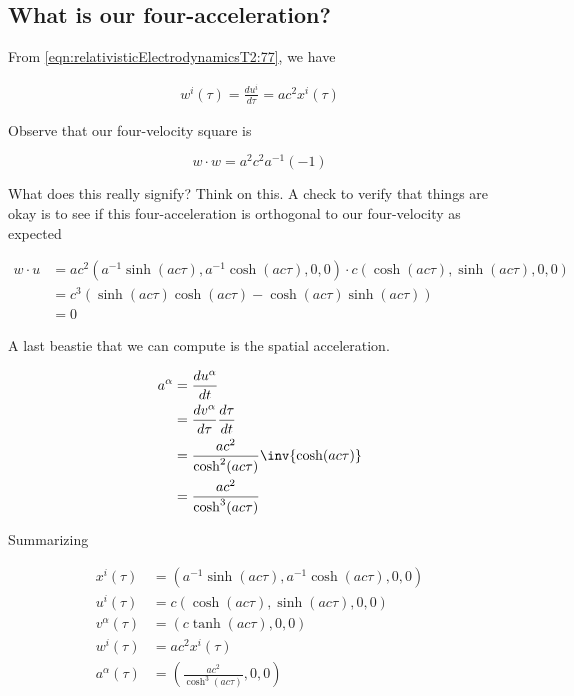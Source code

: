 \subsection{ What is our four-acceleration? }

From \ref{eqn:relativisticElectrodynamicsT2:77}, we have

\begin{align*}
w^i (\tau) = \frac{ du^i }{d\tau} = a c^2 x^i(\tau)
\end{align*}

Observe that our four-velocity square is

\begin{equation}\label{eqn:relativisticElectrodynamicsT2:78}
w \cdot w = a^2 c^2 a^{-1} (-1)
\end{equation}

What does this really signify?  Think on this.  A check to verify that things are okay is to see if this four-acceleration is orthogonal to our four-velocity as expected

\begin{align*}
w \cdot u 
&= 
a c^2 ( a^{-1} \sinh( a c \tau), a^{-1} \cosh( a c \tau ), 0, 0 ) \cdot c ( \cosh( a c \tau ), \sinh( a c \tau ), 0, 0) \\
&=
c^3 ( \sinh(a c \tau)\cosh(a c \tau) - \cosh(a c \tau) \sinh(a c \tau) ) \\
&=
0
\end{align*}

A last beastie that we can compute is the spatial acceleration.

\begin{align*}
a^\alpha 
&= \frac{du^\alpha}{dt} \\
&= \frac{dv^\alpha}{d\tau} \frac{d \tau}{dt} \\
&= \frac{a c^2}{\cosh^2(a c \tau)} \inv{\cosh(a c \tau) } \\
&= \frac{a c^2}{\cosh^3(a c \tau)} \\
\end{align*}

Summarizing

\begin{align}\label{eqn:relativisticElectrodynamicsT2:150}
x^i(\tau) &= \left( a^{-1} \sinh( a c \tau), a^{-1} \cosh( a c \tau ), 0, 0 \right) \\
u^i(\tau) &= c \left( \cosh( a c \tau ), \sinh( a c \tau ), 0, 0\right) \\
v^\alpha(\tau) &= \left( c \tanh(a c \tau), 0, 0 \right) \\
w^i(\tau) &= a c^2 x^i(\tau) \\
a^\alpha(\tau) &= \left( \frac{a c^2}{\cosh^3 (a c \tau)}, 0, 0 \right) \\
\end{align}

